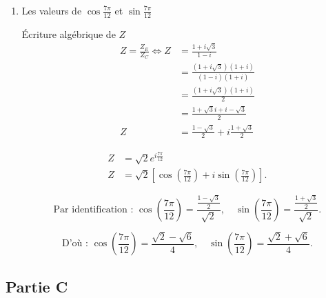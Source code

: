 \documentclass[12pt,a4paper]{article}
\begin{document}
\begin{enumerate}
\begin{enumerate}
\item Les valeurs de $\cos\frac{7\pi}{12}$ et $\sin\frac{7\pi}{12}$

Écriture algébrique de $Z$
\begin{align*}
Z = \frac{Z_E}{Z_C}\iff Z &= \frac{1 + i\sqrt{3}}{1 - i}\\
  &= \frac{(1 + i\sqrt{3})(1 + i)}{(1 - i)(1 + i)}\\
 &= \frac{(1 + i\sqrt{3})(1 + i)}{2}\\
 &= \frac{1 + \sqrt{3}i + i - \sqrt{3}}{2}\\
Z &= \frac{1 - \sqrt{3}}{2} + i \frac{1 + \sqrt{3}}{2}
\end{align*}

\begin{align*}
Z &= \sqrt{2} e^{i\frac{7\pi}{12}}\\
Z &= \sqrt{2} \left[\cos\left(\frac{7\pi}{12}\right) + i\sin\left(\frac{7\pi}{12}\right)\right].
\end{align*}

\[
\text{Par identification : }\cos\left(\frac{7\pi}{12}\right) = \frac{\frac{1 - \sqrt{3}}{2}}{\sqrt{2}}, \quad \sin\left(\frac{7\pi}{12}\right) = \frac{\frac{1 + \sqrt{3}}{2}}{\sqrt{2}}.
\]

\[
\text{D'où : }\boxed{\cos\left(\frac{7\pi}{12}\right) = \frac{\sqrt{2} - \sqrt{6}}{4}, \quad \sin\left(\frac{7\pi}{12}\right) = \frac{\sqrt{2} + \sqrt{6}}{4}}.
\]
\end{enumerate}

\end{enumerate}
\subsection*{ Partie C}
\end{document}
